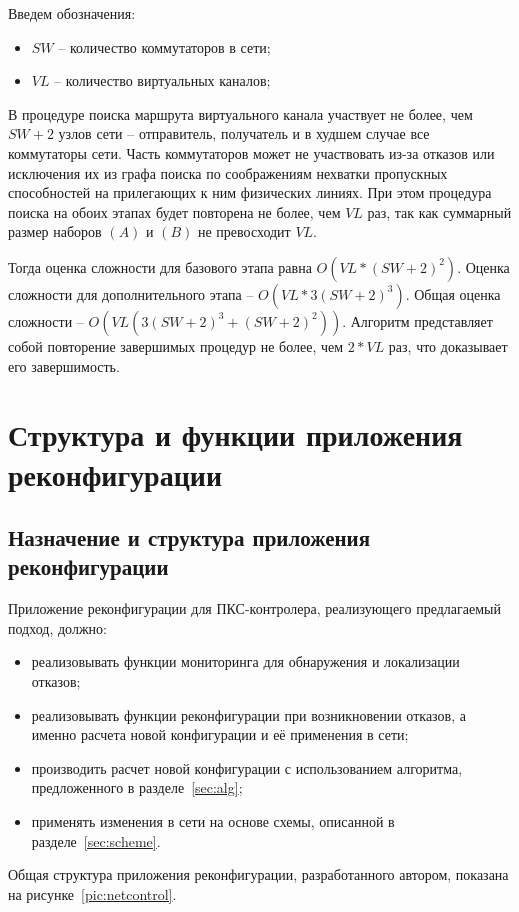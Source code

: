 \documentclass[12pt, a4paper]{article}
\begin{document}
Введем обозначения:
\begin{itemize}
	\item $SW$ -- количество коммутаторов в сети;
	\item $VL$ -- количество виртуальных каналов;
\end{itemize}

В процедуре поиска маршрута виртуального канала участвует не более, чем $SW + 2$ узлов сети -- отправитель, получатель и в худшем случае все коммутаторы сети. Часть коммутаторов может не участвовать из-за отказов или исключения их из графа поиска по соображениям нехватки пропускных способностей на прилегающих к ним физических линиях. При этом процедура поиска на обоих этапах будет повторена не более, чем $VL$ раз, так как суммарный размер наборов $(A)$ и $(B)$ не превосходит $VL$.

Тогда оценка сложности для базового этапа равна $O(VL \ast (SW + 2)^2)$. Оценка сложности для дополнительного этапа -- $O(VL \ast 3(SW + 2)^3)$. Общая оценка сложности -- $O(VL(3(SW + 2)^3 + (SW + 2)^2))$. Алгоритм представляет собой повторение завершимых процедур не более, чем $2 \ast VL$ раз, что доказывает его завершимость.




\section{Структура и функции приложения реконфигурации}
\subsection{Назначение и структура приложения реконфигурации}

Приложение реконфигурации для ПКС-контролера, реализующего предлагаемый подход, должно:
\begin{itemize}
	\item реализовывать функции мониторинга для обнаружения и локализации отказов;
	\item реализовывать функции реконфигурации при возникновении отказов, а именно расчета новой конфигурации и её применения в сети;
	\item производить расчет новой конфигурации с использованием алгоритма, предложенного в разделе~\ref{sec:alg};
	\item применять изменения в сети на основе схемы, описанной в разделе~\ref{sec:scheme}.
\end{itemize}

Общая структура приложения реконфигурации, разработанного автором, показана на рисунке~\ref{pic:netcontrol}.
\end{document}
